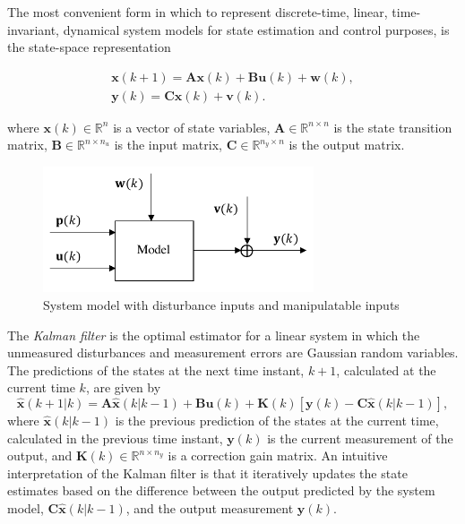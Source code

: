 The most convenient form in which to represent discrete-time, linear, time-invariant, dynamical system models for state estimation and control purposes, is the state-space representation

\begin{equation} \label{eq:ss_rep_uwy}
	\begin{aligned}
		\mathbf{x}(k+1) = \mathbf{A} \mathbf{x}(k) + \mathbf{B} \mathbf{u}(k) + \mathbf{w}(k), \\
		\mathbf{y}(k) = \mathbf{C} \mathbf{x}(k) + \mathbf{v}(k).
	\end{aligned}
\end{equation}

where $\mathbf{x}(k) \in \mathbb{R}^n$ is a vector of state variables, $\mathbf{A} \in \mathbb{R}^{n \times n}$ is the state transition matrix, $\mathbf{B} \in \mathbb{R}^{n \times n_u}$ is the input matrix, $\mathbf{C} \in \mathbb{R}^{n_y \times n}$ is the output matrix.

\begin{figure}[htp]
	\centering
	\includegraphics[width=8cm]{images/model_diag_upwvy.pdf}
	\caption{System model with disturbance inputs and manipulatable inputs}
	\label{fig:model_diag_upwvy}
\end{figure}

The \textit{Kalman filter} \citep{kalman_new_1961} is the optimal estimator for a linear system in which the unmeasured disturbances and measurement errors are Gaussian random variables. The predictions of the states at the next time instant, $k+1$, calculated at the current time $k$, are given by
\begin{equation} \label{eq:xkp1_hat}
	\mathbf{\hat{x}}(k+1|k) = \mathbf{A} \mathbf{\hat{x}}(k|k-1) + \mathbf{B}\mathbf{u}(k) + 
	\mathbf{K}(k)\left[\mathbf{y}(k) - \mathbf{C} \mathbf{\hat{x}}(k|k-1)\right],
\end{equation}
where $\mathbf{\hat{x}}(k|k-1)$ is the previous prediction of the states at the current time, calculated in the previous time instant, $\mathbf{y}(k)$ is the current measurement of the output, and $\mathbf{K}(k) \in \mathbb{R}^{n \times n_y}$ is a correction gain matrix. An intuitive interpretation of the Kalman filter is that it iteratively updates the state estimates based on the difference between the output predicted by the system model, $\mathbf{C} \mathbf{\hat{x}}(k|k-1)$, and the output measurement $\mathbf{y}(k)$.

